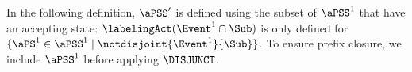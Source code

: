 In the following definition, $\aPSS'$ is defined using the subset of
$\aPSS^1$ that have an accepting state: $\labelingAct(\Event^1\cap\Sub)$ is only defined for
$\{\aPS^1\in\aPSS^1\mid \notdisjoint{\Event^1}{\Sub}\}$.  To ensure prefix
closure, we include $\aPSS^1$ before applying $\DISJUNCT$.





